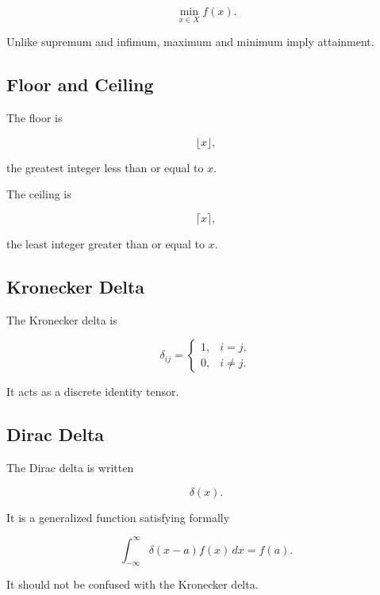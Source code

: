 \[
\boxed{
\min_{x\in X}f(x).
}
\]

Unlike supremum and infimum, maximum and minimum imply attainment.

\subsection{Floor and Ceiling}
\label{subsec:floor-ceiling-reference}

The floor is

\[
\boxed{
\lfloor x\rfloor,
}
\]

the greatest integer less than or equal to \(x\).

The ceiling is

\[
\boxed{
\lceil x\rceil,
}
\]

the least integer greater than or equal to \(x\).

\subsection{Kronecker Delta}
\label{subsec:kronecker-delta-reference}

The Kronecker delta is

\[
\boxed{
\delta_{ij}
=
\begin{cases}
1, & i=j,\\
0, & i\neq j.
\end{cases}
}
\]

It acts as a discrete identity tensor.

\subsection{Dirac Delta}
\label{subsec:dirac-delta-reference}

The Dirac delta is written

\[
\boxed{
\delta(x).
}
\]

It is a generalized function satisfying formally

\[
\boxed{
\int_{-\infty}^{\infty}
\delta(x-a)f(x)\,dx
=
f(a).
}
\]

It should not be confused with the Kronecker delta.

